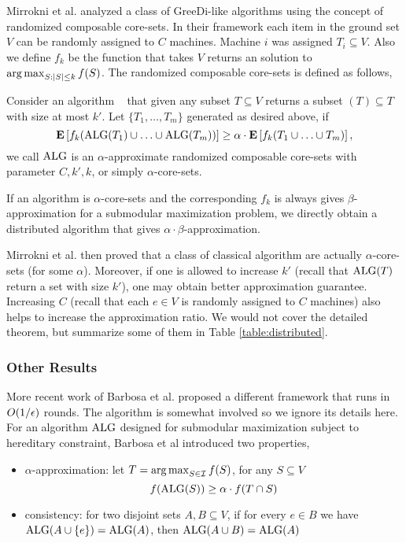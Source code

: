 Mirrokni et al. \cite{MZ15} analyzed a class of {\sc GreeDi}-like algorithms using the concept of randomized composable core-sets. In their framework each item in the ground set $V$ can be randomly assigned to $C$ machines. Machine $i$ was assigned $T_i \subseteq V$. Also we define $f_k$ be the function that takes $V$ returns an solution to $\operatorname*{arg\,max}_{S:|S|\leq k} f(S)$. The randomized composable core-sets is defined as follows,
\begin{definition}[Informal]
  \label{def:core-sets}
  Consider an algorithm \alg~ that given any subset $T\subseteq V$ returns a subset \alg$(T)\subseteq T$ with size at most $k'$. Let $\{T_1, \ldots, T_m\}$ generated as desired above, if 
$$\mathbf{E}\left[f_k(\text{ALG}(T_1)\cup\ldots\cup\text{ALG}(T_m))\right] \geq \alpha \cdot \mathbf{E}\left[f_k(T_1\cup\ldots\cup T_m)\right],$$
we call $\text{ALG}$ is an $\alpha$-approximate randomized composable core-sets with parameter $C, k', k$, or simply $\alpha$-core-sets.
\end{definition}
If an algorithm is $\alpha$-core-sets and the corresponding $f_k$ is always gives $\beta$-approximation for a submodular maximization problem, we directly obtain a distributed algorithm that gives $\alpha\cdot\beta$-approximation.



Mirrokni et al. \cite{MZ15} then proved that a class of classical algorithm are actually $\alpha$-core-sets (for some $\alpha$). Moreover, if one is allowed to increase $k'$ (recall that $\text{ALG}(T)$ return a set with size $k'$), one may obtain better approximation guarantee. Increasing $C$ (recall that each $e\in V$ is randomly assigned to $C$ machines) also helps to increase the approximation ratio. We would not cover the detailed theorem, but summarize some of them in Table \ref{table:distributed}.

\subsubsection{Other Results}
More recent work of Barbosa et al. \cite{BAN+2015new} proposed a different framework that runs in $O(1/\epsilon)$ rounds. The algorithm is somewhat involved so we ignore its details here. For an algorithm $\text{ALG}$ designed for submodular maximization subject to hereditary constraint, Barbosa et al introduced two properties,
\begin{itemize}
\item $\alpha$-approximation: let $T = \operatorname*{arg\,max}_{S\in\mathcal{I}} f(S)$, for any $S \subseteq V$
$$f(\text{ALG}(S)) \geq \alpha \cdot f(T\cap S)$$
\item consistency: for two disjoint sets $A, B \subseteq V$, if for every $e\in B$ we have $\text{ALG}(A\cup\{e\}) = \text{ALG}(A)$, then $\text{ALG}(A\cup B) = \text{ALG}(A)$
\end{itemize}

